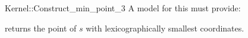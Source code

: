 \begin{ccRefFunctionObjectConcept}{Kernel::Construct_min_point_3}
A model for this must provide:


       {returns the point of $s$ with lexicographically smallest coordinates.}

\end{ccRefFunctionObjectConcept}
